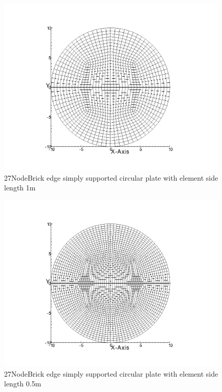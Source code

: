 \documentclass[fleqn,11pt,letter]{article}
\begin{document}
\begin{figure}[H]
  \centering
  \includegraphics[width=11cm]{../Figure_files/27NodeBrick/circular_plate4.png}
  \caption{27NodeBrick edge simply supported circular plate with element side length 1m }
  \label{fig 27NodeBrick edges simply supported circular plate with element side length 1m }
\end{figure}


\begin{figure}[H]
  \centering
  \includegraphics[width=11cm]{../Figure_files/27NodeBrick/circular_plate5.png}
  \caption{27NodeBrick edge simply supported circular plate with element side length 0.5m }
  \label{fig 27NodeBrick edges simply supported circular plate with element side length 0.5m }
\end{figure}

\newpage
\end{document}
